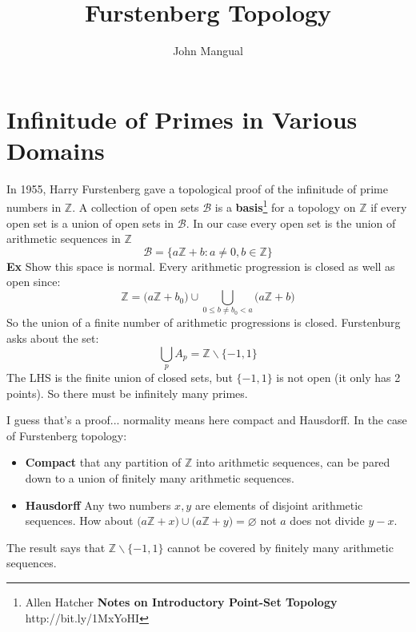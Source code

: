 \documentclass[12pt]{article}
\title{Furstenberg Topology}
\author{John Mangual}
\date{}
\begin{document}
{\selectfont

\maketitle

\section{Infinitude of Primes in Various Domains}


In 1955, Harry Furstenberg gave a topological proof of the infinitude of prime numbers in $\mathbb{Z}$. A collection of open sets $\mathcal{B}$ is a \textbf{basis}\footnote{Allen Hatcher \textbf{Notes on Introductory Point-Set Topology} http://bit.ly/1MxYoHI} for a topology on $\mathbb{Z}$ if every open set is a union of open sets in $\mathcal{B}$. In our case every open set is the union of arithmetic sequences in $\mathbb{Z}$ 
$$\mathcal{B} = \{ a\mathbb{Z} + b: a \neq 0, b \in \mathbb{Z}\}$$
\noindent \textbf{Ex} {\color{green}Show this space is normal}.   Every arithmetic progression is closed as well as open since:
$$ \mathbb{Z} = \big( a\mathbb{Z} + b_0 \big) \cup \bigcup_{0 \leq b\neq b_0 < a} \big( a\mathbb{Z} + b \big)$$
So the union of a finite number of arithmetic progressions is closed. Furstenburg asks about the set:
$$  \bigcup_p A_p  = \mathbb{Z} \backslash \{-1,1 \}$$
The LHS is the finite union of closed sets, but $\{ -1,1\}$ is not open (it only has 2 points).  So there must be infinitely many primes. \newline

\noindent I guess that's a proof... normality means here compact and Hausdorff.  In the case of Furstenberg topology:
\begin{itemize}
	\item \textbf{Compact} that any partition of $\mathbb{Z}$ into arithmetic sequences, can be pared down to a union of finitely many arithmetic sequences.  
	\item \textbf{Hausdorff} Any two numbers $x,y$ are elements of disjoint arithmetic sequences.  How about $\big(a\mathbb{Z} + x\big) \cup \big( a\mathbb{Z} + y \big) = \varnothing$ not $a$ does not divide $y-x$.
\end{itemize}
The result says that $\mathbb{Z} \backslash \{ -1,1\}$ cannot be covered by finitely many arithmetic sequences. \newline 

}
\end{document}
